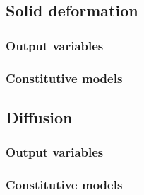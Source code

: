 
\subsection{Solid deformation}

\subsubsection{Output variables}

\subsubsection{Constitutive models}

\subsection{Diffusion}

\subsubsection{Output variables}

\subsubsection{Constitutive models}

